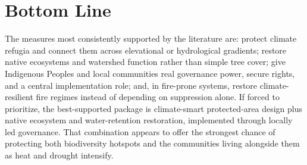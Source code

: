 \documentclass[11pt]{article}
\begin{document}
\section{Bottom Line}
The measures most consistently supported by the literature are: protect climate refugia and connect them across elevational or hydrological gradients; restore native ecosystems and watershed function rather than simple tree cover; give Indigenous Peoples and local communities real governance power, secure rights, and a central implementation role; and, in fire-prone systems, restore climate-resilient fire regimes instead of depending on suppression alone. If forced to prioritize, the best-supported package is climate-smart protected-area design plus native ecosystem and water-retention restoration, implemented through locally led governance. That combination appears to offer the strongest chance of protecting both biodiversity hotspots and the communities living alongside them as heat and drought intensify.
\end{document}
